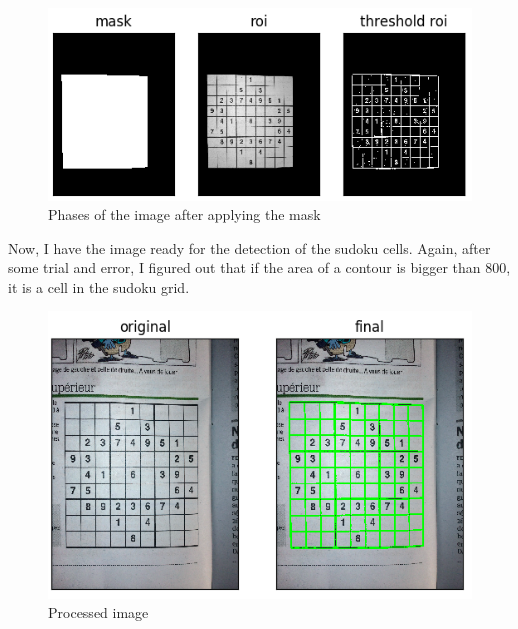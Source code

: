 \begin{figure}[H]
    \centering
    \includegraphics[width=\textwidth]{images/masked.png}
    \caption{Phases of the image after applying the mask}
    \setlength{\belowcaptionskip}{-20pt}
    \setlength{\abovecaptionskip}{-20pt}
\end{figure}

Now, I have the image ready for the detection of the sudoku cells. Again, after some trial and error, I figured out that if the area of a contour is bigger than 800, it is a cell in the sudoku grid.

\begin{figure}[H]
    \centering
    \includegraphics[width=\textwidth]{images/final.png}
    \caption{Processed image}
    \setlength{\belowcaptionskip}{-20pt}
    \setlength{\abovecaptionskip}{-20pt}
\end{figure}

